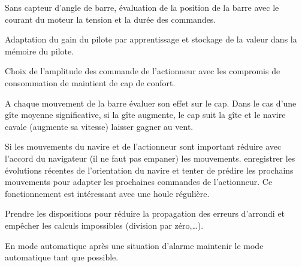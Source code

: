 \documentclass[a4paper,11pt]{report}
\begin{document}
Sans capteur d'angle de barre, évaluation de la position de la barre avec le courant du moteur la tension et la durée des commandes.

Adaptation du gain du pilote par apprentissage et stockage de la valeur
dans la mémoire du pilote.

Choix de l'amplitude des commande de l'actionneur avec les compromis de consommation
de maintient de cap de confort.

A chaque mouvement de la barre évaluer son effet sur le cap.
Dans le cas d'une gîte moyenne significative, si la gîte augmente, le cap suit
la gîte et le navire cavale (augmente sa vitesse) laisser gagner au vent.

Si les mouvements du navire et de l'actionneur sont important réduire avec
l'accord du navigateur (il ne faut pas empaner) les mouvements.
enregistrer les évolutions récentes de l'orientation du navire et tenter de
prédire les prochains mouvements pour adapter les prochaines commandes de l'actionneur.
Ce fonctionnement est intéressant avec une houle régulière.

Prendre les dispositions pour réduire la propagation des erreurs d'arrondi
et empêcher les calculs impossibles (division par zéro,\dots).

En mode automatique après une situation d'alarme maintenir le mode automatique
tant que possible.
\end{document}
